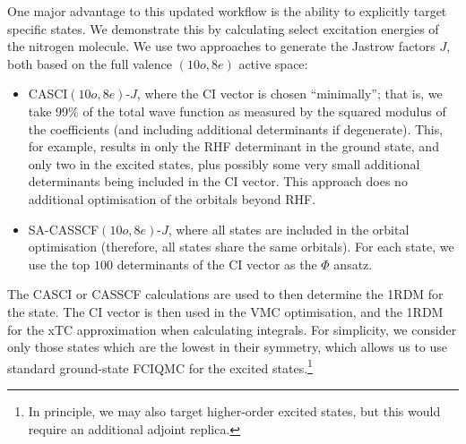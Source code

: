 One major advantage to this updated workflow is the ability to explicitly target specific states. We demonstrate this by calculating select excitation energies of the nitrogen molecule. We use two approaches to generate the Jastrow factors $J$, both based on the full valence $(10o,8e)$ active space:
\begin{itemize}
    \item CASCI$(10o,8e)$-$J$, where the CI vector is chosen ``minimally''; that is, we take 99\% of the total wave function as measured by the squared modulus of the coefficients (and including additional determinants if degenerate). This, for example, results in only the RHF determinant in the ground state, and only two in the excited states, plus possibly some very small additional determinants being included in the CI vector. This approach does no additional optimisation of the orbitals beyond RHF.
    \item \Gls{SA}-CASSCF$(10o,8e)$-$J$, where all states are included in the orbital optimisation (therefore, all states share the same orbitals). For each state, we use the top $100$ determinants of the CI vector as the $\Phi$ ansatz.
\end{itemize}
The CASCI or CASSCF calculations are used to then determine the 1RDM for the state. The CI vector is then used in the VMC optimisation, and the 1RDM for the xTC approximation when calculating integrals. For simplicity, we consider only those states which are the lowest in their symmetry, which allows us to use standard ground-state FCIQMC for the excited states.\footnote{In principle, we may also target higher-order excited states, but this would require an additional adjoint replica.\supercite{bluntExcitedstateApproachFull2015}}



